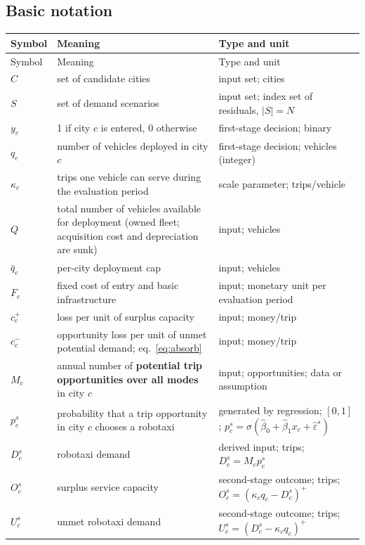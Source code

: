 \documentclass[10pt,a4paper]{article}
\begin{document}
\subsection{Basic notation}
{\footnotesize
\begin{longtable}{@{}L{0.10\textwidth}L{0.43\textwidth}L{0.41\textwidth}@{}}
\toprule Symbol & Meaning & Type and unit\\\midrule\endfirsthead
\toprule Symbol & Meaning & Type and unit\\\midrule\endhead\bottomrule\endlastfoot
$C$ & set of candidate cities & input set; cities\\
$S$ & set of demand scenarios & input set; index set of residuals, $|S|=N$\\
$y_c$ & 1 if city $c$ is entered, 0 otherwise & first-stage decision; binary\\
$q_c$ & number of vehicles deployed in city $c$ & first-stage decision; vehicles (integer)\\
$\kappa_c$ & trips one vehicle can serve during the evaluation period & scale parameter; trips/vehicle\\
$Q$ & total number of vehicles available for deployment (owned fleet; acquisition cost and depreciation are sunk) & input; vehicles\\
$\bar q_c$ & per-city deployment cap & input; vehicles\\
$F_c$ & fixed cost of entry and basic infrastructure & input; monetary unit per evaluation period\\
$c_c^+$ & loss per unit of surplus capacity & input; money/trip\\
$c_c^-$ & opportunity loss per unit of unmet potential demand; eq.\ \eqref{eq:absorb} & input; money/trip\\
$M_c$ & annual number of \textbf{potential trip opportunities over all modes} in city $c$ & input; opportunities; data or assumption\\
$p_c^s$ & probability that a trip opportunity in city $c$ chooses a robotaxi & generated by regression; $[0,1]$; $p_c^s=\sigma(\hat\beta_0+\hat\beta_1x_c+\hat\varepsilon^s)$\\
$D_c^s$ & robotaxi demand & derived input; trips; $D_c^s=M_c p_c^s$\\
$O_c^s$ & surplus service capacity & second-stage outcome; trips; $O_c^s=(\kappa_c q_c-D_c^s)^+$\\
$U_c^s$ & unmet robotaxi demand & second-stage outcome; trips; $U_c^s=(D_c^s-\kappa_c q_c)^+$\\
\end{longtable}}
\end{document}
